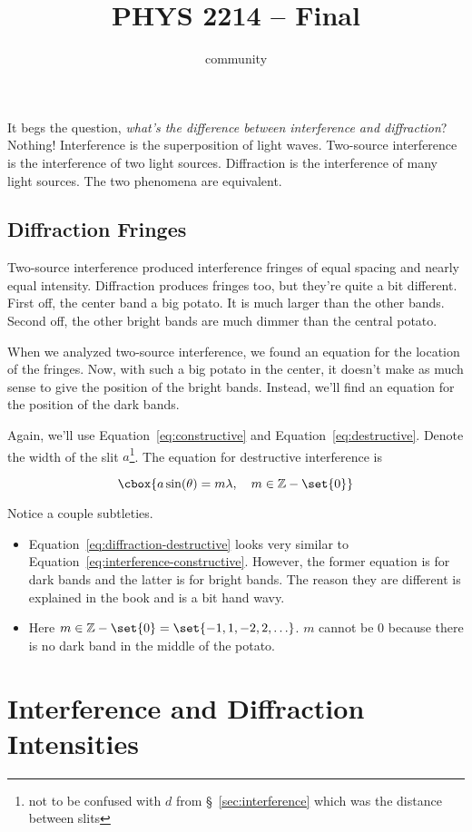 \documentclass{hw} \title{PHYS 2214 -- Final} \author{community}
\numberwithin{equation}{section}
\begin{document}
It begs the question, \emph{what's the difference between interference and
diffraction}? Nothing! Interference is the superposition of light waves.
Two-source interference is the interference of two light sources. Diffraction
is the interference of many light sources. The two phenomena are equivalent.  

\subsection{Diffraction Fringes} Two-source interference produced interference
fringes of equal spacing and nearly equal intensity. Diffraction produces
fringes too, but they're quite a bit different. First off, the center band a
big potato. It is much larger than the other bands. Second off, the other
bright bands are much dimmer than the central potato. 

When we analyzed two-source interference, we found an equation for the location
of the fringes. Now, with such a big potato in the center, it doesn't make as
much sense to give the position of the bright bands. Instead, we'll find an
equation for the position of the dark bands.

Again, we'll use Equation~\ref{eq:constructive} and
Equation~\ref{eq:destructive}. Denote the width of the slit $a$\footnote{not to
be confused with $d$ from \S~\ref{sec:interference} which was the distance
between slits}. The equation for destructive interference is

\begin{equation}\label{eq:diffraction-destructive} \cbox{a \sin(\theta) = m
  \lambda, \quad m \in \mathbb{Z} - \set{0}} \end{equation}

Notice a couple subtleties.  \begin{itemize} \item
      Equation~\ref{eq:diffraction-destructive} looks very similar to
      Equation~\ref{eq:interference-constructive}. However, the former equation
      is for dark bands and the latter is for bright bands. The reason they are
    different is explained in the book and is a bit hand wavy.  \item Here $m
      \in \mathbb{Z} - \set{0} = \set{-1, 1, -2, 2, \ldots}$. $m$ cannot be $0$
      because there is no dark band in the middle of the potato.  \end{itemize}

\section{Interference and Diffraction Intensities}
\end{document}
